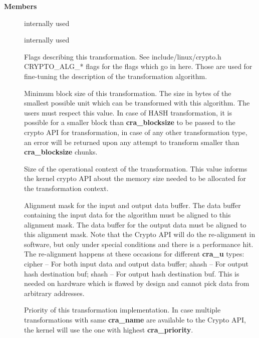 \documentclass[a4paper,8pt,english]{sphinxmanual}
\begin{document}
\textbf{Members}
\begin{description}
\item[{}] \leavevmode
internally used

\item[{}] \leavevmode
internally used

\item[{}] \leavevmode
Flags describing this transformation. See include/linux/crypto.h
CRYPTO\_ALG\_* flags for the flags which go in here. Those are
used for fine-tuning the description of the transformation
algorithm.

\item[{}] \leavevmode
Minimum block size of this transformation. The size in bytes
of the smallest possible unit which can be transformed with
this algorithm. The users must respect this value.
In case of HASH transformation, it is possible for a smaller
block than \textbf{cra\_blocksize} to be passed to the crypto API for
transformation, in case of any other transformation type, an
error will be returned upon any attempt to transform smaller
than \textbf{cra\_blocksize} chunks.

\item[{}] \leavevmode
Size of the operational context of the transformation. This
value informs the kernel crypto API about the memory size
needed to be allocated for the transformation context.

\item[{}] \leavevmode
Alignment mask for the input and output data buffer. The data
buffer containing the input data for the algorithm must be
aligned to this alignment mask. The data buffer for the
output data must be aligned to this alignment mask. Note that
the Crypto API will do the re-alignment in software, but
only under special conditions and there is a performance hit.
The re-alignment happens at these occasions for different
\textbf{cra\_u} types: cipher -- For both input data and output data
buffer; ahash -- For output hash destination buf; shash --
For output hash destination buf.
This is needed on hardware which is flawed by design and
cannot pick data from arbitrary addresses.

\item[{}] \leavevmode
Priority of this transformation implementation. In case
multiple transformations with same \textbf{cra\_name} are available to
the Crypto API, the kernel will use the one with highest
\textbf{cra\_priority}.


\end{description}
\end{document}
